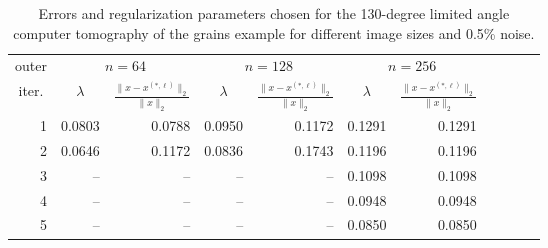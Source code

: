 \begin{table}[htp]
\caption{Errors and regularization parameters chosen for the 130-degree limited angle computer tomography of the grains example for different image sizes and 0.5\% noise.}
\begin{center}
\begin{tabular}{|r|r|r|r|r|r|r|r|r|r|r|}
\hline
\multicolumn{1}{|c|}{outer} & \multicolumn{2}{c|}{$n = 64$} & \multicolumn{2}{c|}{$n = 128$} & \multicolumn{2}{c|}{$n = 256$} \\\cline{2-7}
\multicolumn{1}{|c|}{iter.} & \multicolumn{1}{c|}{$\lambda$} & \multicolumn{1}{c|}{$\frac{\|x - x^{(*,\ell)}\|_2}{\|x\|_2}$} & \multicolumn{1}{c|}{$\lambda$} & \multicolumn{1}{c|}{$\frac{\|x - x^{(*,\ell)}\|_2}{\|x\|_2}$}  & \multicolumn{1}{c|}{$\lambda$} & \multicolumn{1}{c|}{$\frac{\|x - x^{(*,\ell)}\|_2}{\|x\|_2}$} \\
\hline
1 & 0.0803 & 0.0788 & 0.0950 & 0.1172 & 0.1291 & 0.1291 \\
2 & 0.0646 & 0.1172 & 0.0836 & 0.1743 & 0.1196 & 0.1196 \\
3 & -- & -- & -- & -- & 0.1098 & 0.1098 \\
4 & -- & -- & -- & -- & 0.0948 & 0.0948 \\
5 & -- & -- & -- & -- & 0.0850 & 0.0850 \\
\hline
\end{tabular}
\end{center}
\label{tab:limited_angle_errs_and_reg_params}
\end{table}%
